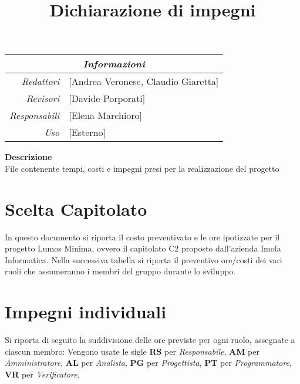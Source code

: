 \documentclass[12pt]{article}
\begin{document}
\graphicspath{ {../templates/img/} }


\title{Dichiarazione di impegni}
\firstPage

\maketitle

\begin{center}
    \begin{tabular}{r | l}
		\multicolumn{2}{c}{\textit{Informazioni}}\\
		\hline
		
			\textit{Redattori} &
			[Andrea Veronese, Claudio Giaretta]\makecell{}\\

			\textit{Revisori} &
			[Davide Porporati]\makecell{}\\
			\textit{Responsabili} &
			[Elena Marchioro]\makecell{}\\
		      \textit{Uso} & 
                [Esterno]\makecell{}\\
    \end{tabular}
\end{center}
\begin{center}
    \textbf{Descrizione}\\
    File contenente tempi, costi e impegni presi per la realizzazione del progetto
\end{center}
\pagebreak

\tableofcontents
\pagebreak

\printindex 
\section{Scelta Capitolato}
In questo documento si riporta il costo preventivato e le ore ipotizzate per il progetto Lumos Minima, ovvero il capitolato C2 proposto dall'azienda Imola Informatica.
Nella successiva tabella si riporta il preventivo ore/costi dei vari ruoli che assumeranno i membri del gruppo durante lo sviluppo.

\section{Impegni individuali}
Si riporta di seguito la suddivisione delle ore previste per ogni ruolo, assegnate a ciascun membro:
\smallskip
\noindent Vengono usate le sigle \textbf{RS} per \textit{Responsabile}, \textbf{AM} per \textit{Amministratore}, \textbf{AL} per \textit{Analista}, \textbf{PG} per \textit{Progettista}, \textbf{PT} per \textit{Programmatore}, \textbf{VR} per \textit{Verificatore}.
\end{document}
